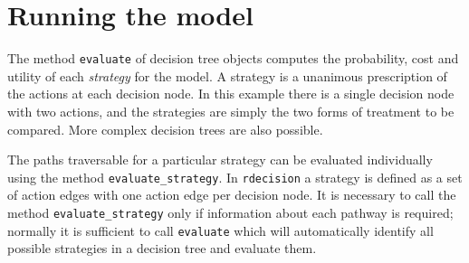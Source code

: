 \documentclass[
]{article}
\newenvironment{Shaded}{\begin{snugshade}}{\end{snugshade}}
\newcommand{\CommentTok}[1]{\textcolor[rgb]{0.56,0.35,0.01}{\textit{#1}}}
\newcommand{\DataTypeTok}[1]{\textcolor[rgb]{0.13,0.29,0.53}{#1}}
\newcommand{\KeywordTok}[1]{\textcolor[rgb]{0.13,0.29,0.53}{\textbf{#1}}}
\newcommand{\NormalTok}[1]{#1}
\newcommand{\OperatorTok}[1]{\textcolor[rgb]{0.81,0.36,0.00}{\textbf{#1}}}
\newcommand{\StringTok}[1]{\textcolor[rgb]{0.31,0.60,0.02}{#1}}
\begin{document}
\begin{Shaded}
\end{Shaded}

\hypertarget{running-the-model}{%
\section{Running the model}\label{running-the-model}}

The method \texttt{evaluate} of decision tree objects computes the
probability, cost and utility of each \emph{strategy} for the model. A
strategy is a unanimous prescription of the actions at each decision
node. In this example there is a single decision node with two actions,
and the strategies are simply the two forms of treatment to be compared.
More complex decision trees are also possible.

The paths traversable for a particular strategy can be evaluated
individually using the method \texttt{evaluate\_strategy}. In
\texttt{rdecision} a strategy is defined as a set of action edges with
one action edge per decision node. It is necessary to call the method
\texttt{evaluate\_strategy} only if information about each pathway is
required; normally it is sufficient to call \texttt{evaluate} which will
automatically identify all possible strategies in a decision tree and
evaluate them.
\end{document}
